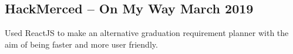 \documentclass[../Resume.tex]{subfiles}
\begin{document}
    \subsection{HackMerced -- On My Way \null\hfill March 2019}
    \par Used ReactJS to make an alternative graduation requirement planner with the aim of being faster and more user friendly.
    \vspace*{-2mm}
\end{document}
